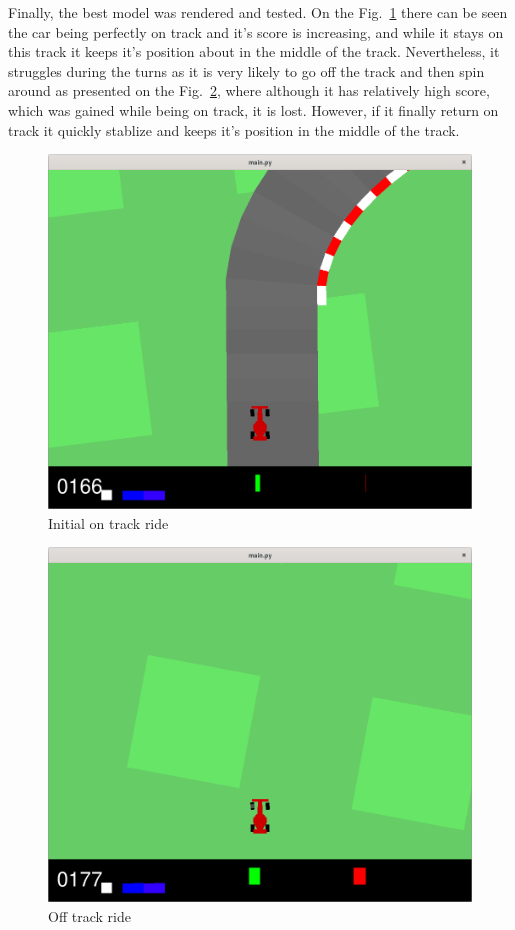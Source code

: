 \documentclass[runningheads]{llncs}
\begin{document}
Finally, the best model was rendered and tested. On the Fig.~\ref{fig:on_track} there can be seen the car being perfectly on track and it's score is increasing, and while it stays on this track it keeps it's position about in the middle of the track. Nevertheless, it struggles during the turns as it is very likely to go off the track and then spin around as presented on the Fig.~\ref{fig:off_track}, where although it has relatively high score, which was gained while being on track, it is lost. However, if it finally return on track it quickly stablize and keeps it's position in the middle of the track.
\begin{figure}
  \includegraphics[width=\textwidth]{Screenshots/on_track.png}
  \caption{Initial on track ride}
  \label{fig:on_track}
\end{figure}

\begin{figure}
  \includegraphics[width=\textwidth]{Screenshots/off_track.png}
  \caption{Off track ride}
  \label{fig:off_track}
\end{figure}
\end{document}
